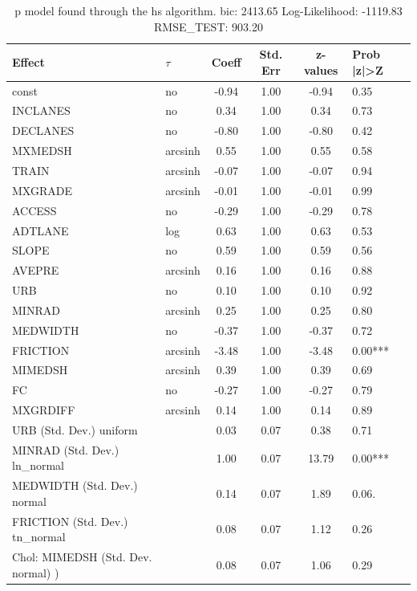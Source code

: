 \begin{table}
	\caption{p model found through the hs algorithm. bic: 2413.65 Log-Likelihood: -1119.83 RMSE_TEST: 903.20}
	\begin{center}
		\begin{tabular}{|l|l|c|c|c|l|}
			\hline
			Effect & $\tau$ & Coeff & Std. Err & z-values & Prob |z|>Z \\
			\hline
			const & no & -0.94 & 1.00 & -0.94 & 0.35 \\
			\hline
			INCLANES & no & 0.34 & 1.00 & 0.34 & 0.73 \\
			\hline
			DECLANES & no & -0.80 & 1.00 & -0.80 & 0.42 \\
			\hline
			MXMEDSH & arcsinh & 0.55 & 1.00 & 0.55 & 0.58 \\
			\hline
			TRAIN & arcsinh & -0.07 & 1.00 & -0.07 & 0.94 \\
			\hline
			MXGRADE & arcsinh & -0.01 & 1.00 & -0.01 & 0.99 \\
			\hline
			ACCESS & no & -0.29 & 1.00 & -0.29 & 0.78 \\
			\hline
			ADTLANE & log & 0.63 & 1.00 & 0.63 & 0.53 \\
			\hline
			SLOPE & no & 0.59 & 1.00 & 0.59 & 0.56 \\
			\hline
			AVEPRE & arcsinh & 0.16 & 1.00 & 0.16 & 0.88 \\
			\hline
			URB & no & 0.10 & 1.00 & 0.10 & 0.92 \\
			\hline
			MINRAD & arcsinh & 0.25 & 1.00 & 0.25 & 0.80 \\
			\hline
			MEDWIDTH & no & -0.37 & 1.00 & -0.37 & 0.72 \\
			\hline
			FRICTION & arcsinh & -3.48 & 1.00 & -3.48 & 0.00*** \\
			\hline
			MIMEDSH & arcsinh & 0.39 & 1.00 & 0.39 & 0.69 \\
			\hline
			FC & no & -0.27 & 1.00 & -0.27 & 0.79 \\
			\hline
			MXGRDIFF & arcsinh & 0.14 & 1.00 & 0.14 & 0.89 \\
			\hline
			URB (Std. Dev.) uniform &  & 0.03 & 0.07 & 0.38 & 0.71 \\
			\hline
			MINRAD (Std. Dev.) ln_normal &  & 1.00 & 0.07 & 13.79 & 0.00*** \\
			\hline
			MEDWIDTH (Std. Dev.) normal &  & 0.14 & 0.07 & 1.89 & 0.06. \\
			\hline
			FRICTION (Std. Dev.) tn_normal &  & 0.08 & 0.07 & 1.12 & 0.26 \\
			\hline
			 Chol: MIMEDSH (Std. Dev. normal) ) &  & 0.08 & 0.07 & 1.06 & 0.29 \\

\end{tabular}
\end{center}
\end{table}
